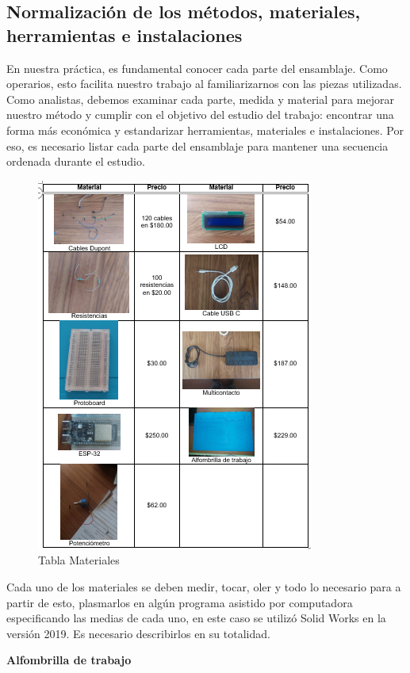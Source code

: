 \subsection{Normalización de los métodos, materiales, herramientas e instalaciones}    

En nuestra práctica, es fundamental conocer cada parte del ensamblaje. Como operarios, esto facilita nuestro trabajo al familiarizarnos con las piezas utilizadas. Como analistas, debemos examinar cada parte, medida y material para mejorar nuestro método y cumplir con el objetivo del estudio del trabajo: encontrar una forma más económica y estandarizar herramientas, materiales e instalaciones. Por eso, es necesario listar cada parte del ensamblaje para mantener una secuencia ordenada durante el estudio.

\begin{figure}[H]
    \centering
    \includegraphics[scale=0.4]{10/Img/tablaMaterial.png}
    \caption{Tabla Materiales}
    \label{fig:tablaMaterial.png}
\end{figure}

Cada uno de los materiales se deben medir, tocar, oler y todo lo necesario para a partir de esto, plasmarlos en algún programa asistido por computadora especificando las medias de cada uno, en este caso se utilizó Solid Works en la versión 2019. Es necesario describirlos en su totalidad.

\textbf{Alfombrilla de trabajo}

